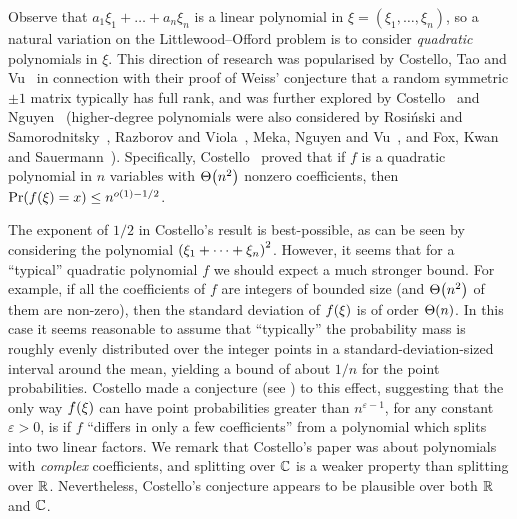 \documentclass{daj}
\theoremstyle{plain}
\theoremstyle{plain}
\theoremstyle{plain}
\theoremstyle{plain}
\theoremstyle{definition}
\theoremstyle{plain}
\theoremstyle{plain}
\theoremstyle{definition}
\theoremstyle{definition}
\theoremstyle{plain}
\let\originalleft\left
\let\originalright\right
\renewcommand{\left}{\mathopen{}\mathclose\bgroup\originalleft}
\renewcommand{\right}{\aftergroup\egroup\originalright}
\begin{document}
Observe that $a_{1}\xi_{1}+\dots+a_{n}\xi_{n}$ is a linear polynomial
in $\xi=(\xi_1,\dots,\xi_n)$, so a natural variation on the Littlewood--Offord problem
is to consider \emph{quadratic} polynomials in $\xi$. This direction
of research was popularised by Costello, Tao and Vu~\cite{CTV06}
in connection with their proof of Weiss' conjecture that a random
symmetric $\pm1$ matrix typically has full rank, and was further
explored by Costello~\cite{Cos13} and Nguyen~\cite{Ngu12} (higher-degree
polynomials were also considered by Rosi\'nski and Samorodnitsky~\cite{RS96},
Razborov and Viola~\cite{RV13}, Meka, Nguyen and Vu~\cite{MNV16},
and Fox, Kwan and Sauermann~\cite{FKS1}). Specifically, Costello~\cite{Cos13}
proved that if $f$ is a quadratic polynomial in $n$
variables with $\Theta\left(n^{2}\right)$ nonzero coefficients, then
$\Pr\left(f\left(\xi\right)=x\right)\le n^{o\left(1\right)-1/2}$.

The exponent of $1/2$ in Costello's result is best-possible, as can
be seen by considering the polynomial $\left(\xi_{1}+\dots+\xi_{n}\right)^{2}$.
However, it seems that for a ``typical'' quadratic polynomial
$f$ we should expect a much stronger bound. For example, if all
the coefficients of $f$ are integers of bounded size (and $\Theta\left(n^{2}\right)$
of them are non-zero), then the standard deviation of $f\left(\xi\right)$
is of order $\Theta\left(n\right)$. In this case it seems reasonable to assume
that ``typically'' the probability mass is roughly evenly distributed
over the integer points in a standard-deviation-sized interval around
the mean, yielding a bound of about $1/n$ for the point probabilities. Costello made a conjecture (see \cite[Conjecture~3]{Cos13}) to
this effect, suggesting that the only way $f\left(\xi\right)$ can
have point probabilities greater than $n^{\varepsilon-1}$, for any
constant $\varepsilon>0$, is if $f$ ``differs in only a few coefficients''
from a polynomial which splits into two linear factors. We remark
that Costello's paper was about polynomials with \emph{complex} coefficients,
and splitting over $\mathbb{C}$ is a weaker property than splitting over
$\mathbb{R}$. Nevertheless, Costello's conjecture appears to be plausible over
both $\mathbb{R}$ and $\mathbb{C}$.
\end{document}
